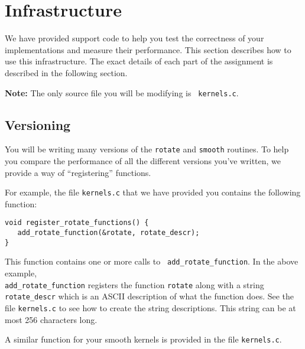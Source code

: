\documentclass[11pt]{article}
\begin{document}
\section{Infrastructure}
We have provided support code to help you test the correctness of your
implementations and measure their performance. This section describes
how to use this infrastructure. The exact details of each part of the
assignment is described in the following section.

{\bf Note:} The only source file you will be modifying is {\tt
kernels.c}.

\subsection*{Versioning}
You will be writing many versions of the {\tt rotate} and {\tt smooth}
routines. To help you compare the performance of all the different
versions you've written, we provide a way of ``registering''
functions.

For example, the file {\tt kernels.c} that we have provided you
contains the following function:
\small{\begin{verbatim}
void register_rotate_functions() {
   add_rotate_function(&rotate, rotate_descr);
}
\end{verbatim}}
This function contains one or more calls to {\tt
add\_rotate\_function}. In the above example, \\
{\tt add\_rotate\_function}
registers the function {\tt rotate} along with a string {\tt
rotate\_descr} which is an ASCII description of what the function does.
See the file {\tt kernels.c} to see how to create the string
descriptions. This string can be at most 256 characters long.

A similar function for your smooth kernels
is provided in the file {\tt kernels.c}.
\end{document}
